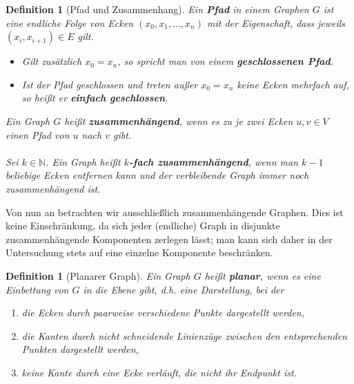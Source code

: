 \documentclass[11pt,a4paper,leqno]{report}
\newtheorem{definition}[theorem]{Definition}
\numberwithin{equation}{chapter}
\begin{document}
\begin{definition}[Pfad und Zusammenhang]
	Ein \textbf{Pfad} in einem Graphen $G$ ist eine endliche Folge von Ecken $(x_0,x_1,\dots, x_n)$ mit der Eigenschaft, dass jeweils $(x_i,x_{i+1}) \in E$ gilt.
	\begin{itemize}
		\item Gilt zusätzlich $x_0 = x_n$, so spricht man von einem \textbf{geschlossenen Pfad}.
		\item Ist der Pfad geschlossen und treten außer $x_0 = x_n$ keine Ecken mehrfach auf, so heißt er \textbf{einfach geschlossen}.
	\end{itemize}
Ein Graph $G$ heißt \textbf{zusammenhängend}, wenn es zu je zwei Ecken $u,v \in V$ einen Pfad von $u$ nach $v$ gibt.\\
\\
 Sei  $k\in\mathbb{N}$. Ein Graph heißt \textbf{$k$-fach zusammen\-h\"angend}, wenn  man $k - 1$ beliebige Ecken entfernen kann und der verbleibende Graph immer noch zusammenh\"angend ist.
\end{definition}
\noindent
Von nun an betrachten wir ausschließlich zusammenhängende Graphen. Dies ist keine Einschränkung, da sich jeder (endliche) Graph in disjunkte zusammenhängende Komponenten zerlegen lässt; man kann sich daher in der Untersuchung stets auf eine einzelne Komponente beschränken.
\begin{definition}[Planarer Graph]
Ein Graph $G$ heißt \textbf{planar}, wenn es eine Einbettung von $G$ in die Ebene gibt, d.h. eine Darstellung, bei der
	\begin{enumerate}
		\item die Ecken durch paarweise verschiedene Punkte dargestellt werden,
		\item die Kanten durch nicht schneidende Linienzüge zwischen den entsprechenden Punkten dargestellt werden,
		\item keine Kante durch eine Ecke verläuft, die nicht ihr Endpunkt ist.
	\end{enumerate}
\end{definition}
\noindent
\end{document}
